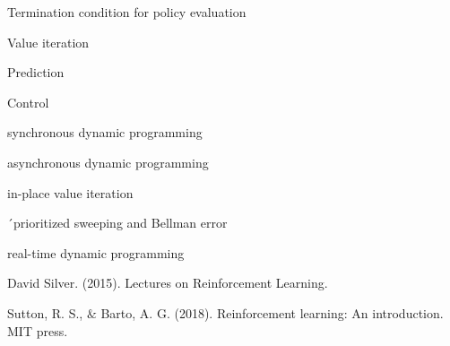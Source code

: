 \documentclass[journal]{IEEEtran}
\begin{document}
Termination condition for policy evaluation

Value iteration

Prediction

Control

synchronous dynamic programming

asynchronous dynamic programming

in-place value iteration

´prioritized sweeping and Bellman error

real-time dynamic programming

\ifCLASSOPTIONcaptionsoff
  \newpage
\fi

\begin{thebibliography}{1}

David Silver. (2015). Lectures on Reinforcement Learning.

Sutton, R. S., $\&$ Barto, A. G. (2018). Reinforcement learning: An introduction. MIT press.
	
\end{thebibliography}
\end{document}
